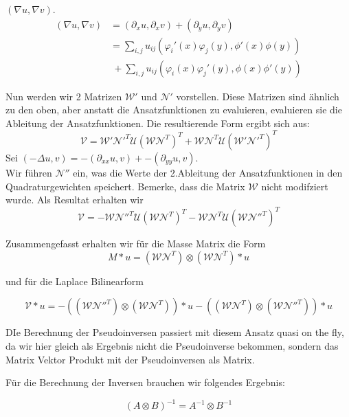 $(\nabla u, \nabla v)$.
\begin{align}
(\nabla u, \nabla v) &=(\partial_x u,\partial_x v) + (\partial_y u,\partial_y v) \\
					   &=\sum_{i,j} u_{ij} (\varphi_i'(x)\varphi_j(y),\phi'(x)\phi(y)) \\
					   & \ + \sum_{i,j} u_{ij} (\varphi_i(x)\varphi_j'(y),\phi(x)\phi'(y))
\end{align}

Nun werden wir 2 Matrizen  $\mathcal{W}'$ und $\mathcal{N}'$ vorstellen.
Diese Matrizen sind ähnlich zu den oben, aber anstatt die Ansatzfunktionen zu evaluieren, evaluieren sie die Ableitung der Ansatzfunktionen. Die resultierende Form ergibt sich aus:
\[\mathcal{V}=\mathcal{W}' \mathcal{N}'^T \mathcal{U} (\mathcal{W} \mathcal{N}^T)^T +\mathcal{W} \mathcal{N}^T \mathcal{U} (\mathcal{W}' \mathcal{N}'^T)^T\]
Sei $(-\Delta u, v)=-(\partial_{xx} u,v) + -(\partial_{yy} u,v)$.\\
Wir führen $\mathcal{N}''$ ein, was die Werte der 2.Ableitung der Ansatzfunktionen in den Quadraturgewichten speichert. Bemerke, dass die Matrix $\mathcal{W}$ nicht modifziert wurde. Als Resultat erhalten wir
\[\mathcal{V}=-\mathcal{W} \mathcal{N}''^T \mathcal{U} (\mathcal{W} \mathcal{N}^T)^T -\mathcal{W} \mathcal{N}^T \mathcal{U} (\mathcal{W} \mathcal{N}''^T)^T\]


Zusammengefasst erhalten wir für die Masse Matrix die Form
\begin{equation}
M*u = (\mathcal{W} \mathcal{N}^{T}) \otimes (\mathcal{W} \mathcal{N}^{T})*u
\end{equation}

und für die Laplace Bilinearform

\begin{equation}
\mathcal{V}*u = -((\mathcal{W} \mathcal{N''}^{T}) \otimes (\mathcal{W} \mathcal{N}^{T}))*u - ((\mathcal{W} \mathcal{N}^{T}) \otimes (\mathcal{W} \mathcal{N''}^{T}))*u
\end{equation}

DIe Berechnung der Pseudoinversen passiert mit diesem Ansatz quasi on the fly, da wir hier gleich als Ergebnis nicht die Pseudoinverse bekommen, sondern das Matrix Vektor Produkt mit der Pseudoinversen als Matrix.

Für die Berechnung der Inversen brauchen wir folgendes Ergebnis:
\begin{Bemerkung}
\begin{equation}
(A \otimes B)^{-1} = A^{-1} \otimes B^{-1}
\end{equation}
\end{Bemerkung}

